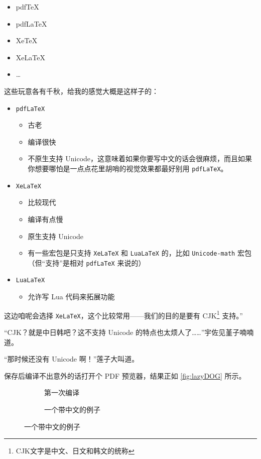 \begin{itemize}\ttfamily
    \item pdfTeX
    \item pdfLaTeX
    \item XeTeX
    \item XeLaTeX
    \item \dots
\end{itemize}

这些玩意各有千秋，给我的感觉大概是这样子的：

\begin{itemize}
    \item \verb"pdfLaTeX"
          \begin{itemize}
              \item 古老
              \item 编译很快
              \item 不原生支持 Unicode，这意味着如果你要写中文的话会很麻烦，而且如果你想要哪怕是一点点花里胡哨的视觉效果都最好别用 \verb"pdfLaTeX"。
          \end{itemize}
    \item \verb"XeLaTeX"
          \begin{itemize}
              \item 比较现代
              \item 编译有点慢
              \item 原生支持 Unicode
              \item 有一些宏包是只支持 \verb"XeLaTeX" 和 \verb"LuaLaTeX" 的，比如 \verb"Unicode-math" 宏包（但“支持”是相对 \verb"pdfLaTeX" 来说的）
          \end{itemize}
    \item \verb"LuaLaTeX"
          \begin{itemize}
              \item 允许写 Lua 代码来拓展功能
          \end{itemize}
\end{itemize}

这边咱呢会选择 \verb`XeLaTeX`，这个比较常用——我们的目的是要有 CJK\footnote{CJK文字是中文、日文和韩文的统称} 支持。”

“CJK？就是中日韩吧？这不支持 Unicode 的特点也太烦人了……”宇佐见堇子喃喃道。

“那时候还没有 Unicode 啊！”莲子大叫道。

保存后编译不出意外的话打开个 PDF 预览器，结果正如 \autoref{fig:lazyDOG} 所示。

\begin{figure}[t]
    \centering
    \begin{subfigure}[t]{0.4\textwidth} \centering
        \caption{第一次编译}
        \label{fig:lazyDOG}
    \end{subfigure}\quad
    \begin{subfigure}[t]{0.4\textwidth} \centering
        \caption{一个带中文的例子}
        \label{fig:滚滚长江东逝水}
    \end{subfigure}
\end{figure}

